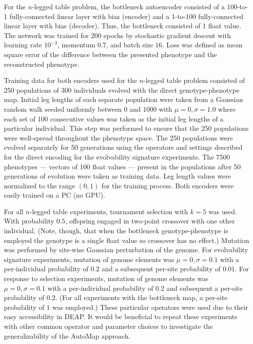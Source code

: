For the $n$-legged table problem, the bottleneck autoencoder consisted of a 100-to-1 fully-connected linear layer with bias (encoder) and a 1-to-100 fully-connected linear layer with bias (decoder).
Thus, the bottleneck consisted of 1 float value.
The network was trained for 200 epochs by stochastic gradient descent with learning rate $10^{-3}$, momentum $0.7$, and batch size $16$.
Loss was defined as mean square error of the difference between the presented phenotype and the reconstructed phenotype.

Training data for both encoders used for the $n$-legged table problem consisted of 250 populations of 300 individuals evolved with the direct genotype-phenotype map.
Initial leg lengths of each separate population were taken from a Gaussian random walk seeded uniformly between $0$ and $1000$ with $\mu = 0, \sigma = 1.0$ where each set of 100 consecutive values was taken as the initial leg lengths of a particular individual.
This step was performed to ensure that the 250 populations were well-spread throughout the phenotype space.
The 250 populations were evolved separately for 50 generations using the operators and settings described for the direct encoding for the evolvability signature experiments.
The 7500 phenotypes --- vectors of 100 float values --- present in the populations after 50 generations of evolution were taken as training data.
Leg length values were normalized to the range $(0,1)$ for the training process.
Both encoders were easily trained on a PC (no GPU).

For all $n$-legged table experiments, tournament selection with $k = 5$ was used.
With probability $0.5$, offspring engaged in two-point crossover with one other individual.
(Note, though, that when the bottleneck genotype-phenotype is employed the genotype is a single float value so crossover has no effect.)
Mutation was performed by site-wise Gaussian perturbation of the genome.
For evolvability signature experiments, mutation of genome elements was $\mu=0, \sigma=0.1$ with a per-individual probability of $0.2$ and a subsequent per-site probability of $0.01$.
For response to selection experiments, mutation of genome elements was $\mu=0, \sigma=0.1$ with a per-individual probability of $0.2$ and subsequent a per-site probability of $0.2$.
(For all experiments with the bottleneck map, a per-site probability of $1$ was employed.)
These particular operators were used due to their easy accessibility in DEAP.
It would be beneficial to repeat these experiments with other common operator and parameter choices to investigate the generalizability of the AutoMap approach.

